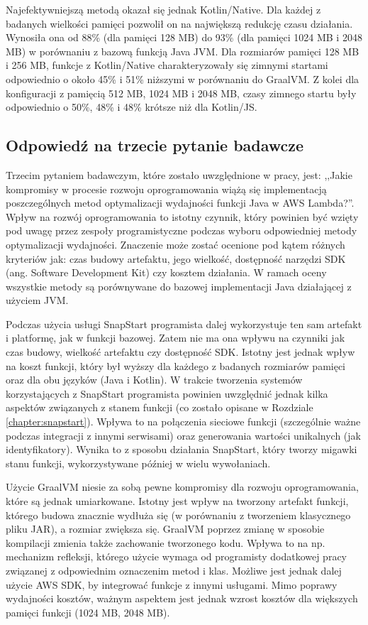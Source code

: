 Najefektywniejszą metodą okazał się jednak Kotlin/Native.
Dla każdej z badanych wielkości pamięci pozwolił on na największą redukcję czasu działania.
Wynosiła ona od 88\% (dla pamięci 128 MB) do 93\% (dla pamięci 1024 MB i 2048 MB) w porównaniu z bazową funkcją Java JVM.
Dla rozmiarów pamięci 128 MB i 256 MB, funkcje z Kotlin/Native charakteryzowały się zimnymi startami odpowiednio o około 45\% i 51\% niższymi w porównaniu do GraalVM.
Z kolei dla konfiguracji z pamięcią 512 MB, 1024 MB i 2048 MB, czasy zimnego startu były odpowiednio o 50\%, 48\% i 48\% krótsze niż dla Kotlin/JS.

\subsection*{Odpowiedź na trzecie pytanie badawcze}

Trzecim pytaniem badawczym, które zostało uwzględnione w pracy, jest: ,,Jakie kompromisy w procesie rozwoju oprogramowania wiążą się implementacją poszczególnych metod optymalizacji wydajności funkcji Java w AWS Lambda?''.
Wpływ na rozwój oprogramowania to istotny czynnik, który powinien być wzięty pod uwagę przez zespoły programistyczne podczas wyboru odpowiedniej metody optymalizacji wydajności.
Znaczenie może zostać ocenione pod kątem różnych kryteriów jak: czas budowy artefaktu, jego wielkość, dostępność narzędzi SDK (ang. Software Development Kit) czy kosztem działania.
W ramach oceny wszystkie metody są porównywane do bazowej implementacji Java działającej z użyciem JVM.

Podczas użycia usługi SnapStart programista dalej wykorzystuje ten sam artefakt i platformę, jak w funkcji bazowej.
Zatem nie ma ona wpływu na czynniki jak czas budowy, wielkość artefaktu czy dostępność SDK.
Istotny jest jednak wpływ na koszt funkcji, który był wyższy dla każdego z badanych rozmiarów pamięci oraz dla obu języków (Java i Kotlin).
W trakcie tworzenia systemów korzystających z SnapStart programista powinien uwzględnić jednak kilka aspektów związanych z stanem funkcji (co zostało opisane w Rozdziale \ref{chapter:snapstart}).
Wpływa to na połączenia sieciowe funkcji (szczególnie ważne podczas integracji z innymi serwisami) oraz generowania wartości unikalnych (jak identyfikatory).
Wynika to z sposobu działania SnapStart, który tworzy migawki stanu funkcji, wykorzystywane później w wielu wywołaniach.

Użycie GraalVM niesie za sobą pewne kompromisy dla rozwoju oprogramowania, które są jednak umiarkowane.
Istotny jest wpływ na tworzony artefakt funkcji, którego budowa znacznie wydłuża się (w porównaniu z tworzeniem klasycznego pliku JAR), a rozmiar zwiększa się.
GraalVM poprzez zmianę w sposobie kompilacji zmienia także zachowanie tworzonego kodu.
Wpływa to na np. mechanizm refleksji, którego użycie wymaga od programisty dodatkowej pracy związanej z odpowiednim oznaczenim metod i klas.
Możliwe jest jednak dalej użycie AWS SDK, by integrować funkcje z innymi usługami.
Mimo poprawy wydajności kosztów, ważnym aspektem jest jednak wzrost kosztów dla większych pamięci funkcji (1024 MB, 2048 MB).

